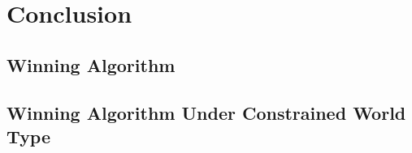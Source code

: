 \chapter{Conclusion}

\section{Winning Algorithm}

\section{Winning Algorithm Under Constrained World Type}


